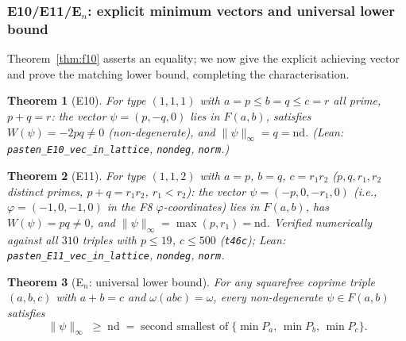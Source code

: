 \documentclass[12pt]{article}
\newtheorem{theorem}{Theorem}
\theoremstyle{definition}
\begin{document}
\subsubsection*{E10/E11/E$_n$: explicit minimum vectors and universal lower bound}

Theorem~\ref{thm:f10} asserts an equality; we now give the explicit achieving vector and
prove the matching lower bound, completing the characterisation.

\begin{theorem}[E10]\label{thm:e10}
For type $(1,1,1)$ with $a=p \le b=q \le c=r$ all prime, $p+q=r$:
the vector $\psi=(p,-q,0)$ lies in $F(a,b)$, satisfies $W(\psi)=-2pq\ne 0$
(non-degenerate), and $\|\psi\|_\infty = q = \mathrm{nd}$.
(Lean: \texttt{pasten\_E10\_vec\_in\_lattice}, \texttt{nondeg}, \texttt{norm}.)
\end{theorem}

\begin{theorem}[E11]\label{thm:e11}
For type $(1,1,2)$ with $a=p$, $b=q$, $c=r_1 r_2$ ($p,q,r_1,r_2$ distinct primes,
$p+q=r_1 r_2$, $r_1<r_2$): the vector $\psi=(-p,0,-r_1,0)$
(i.e., $\varphi=(-1,0,-1,0)$ in the F8 $\varphi$-coordinates) lies in $F(a,b)$,
has $W(\psi)=pq\ne 0$, and $\|\psi\|_\infty=\max(p,r_1)=\mathrm{nd}$.
Verified numerically against all $310$ triples with $p\le 19$, $c\le 500$
(\texttt{t46c}); Lean: \texttt{pasten\_E11\_vec\_in\_lattice}, \texttt{nondeg}, \texttt{norm}.
\end{theorem}

\begin{theorem}[E$_n$: universal lower bound]\label{thm:en}
For any squarefree coprime triple $(a,b,c)$ with $a+b=c$ and $\omega(abc)=\omega$, every
non-degenerate $\psi\in F(a,b)$ satisfies
\[
  \|\psi\|_\infty \;\ge\; \mathrm{nd}
    \;=\;\text{second smallest of}\;\{\min P_a,\,\min P_b,\,\min P_c\}.
\]
\end{theorem}
\end{document}
